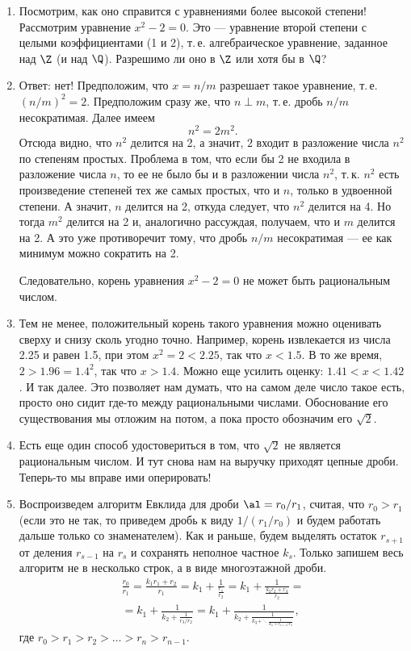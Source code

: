 \begin{enumerate}
\item Посмотрим, как оно справится с уравнениями более высокой степени! Рассмотрим уравнение $x^2-2=0$. Это --- уравнение второй степени с целыми коэффициентами (1 и 2), т.\,е. алгебраическое уравнение, заданное над $\Z$ (и над $\Q$). Разрешимо ли оно в $\Z$ или хотя бы в $\Q$?
\item Ответ: нет! Предположим, что $x=n/m$ разрешает такое уравнение, т.\,е. $(n/m)^2=2$. Предположим сразу же, что $n\perp m$, т.\,е. дробь $n/m$ несократимая. Далее имеем
$$
n^2=2m^2.
$$
Отсюда видно, что $n^2$ делится на 2, а значит, $2$ входит в разложение числа $n^2$ по степеням простых. Проблема в том, что если бы 2 не входила в разложение числа $n$, то ее не было бы и в разложении числа $n^2$, т.\,к. $n^2$ есть произведение степеней тех же самых простых, что и $n$, только в удвоенной степени. А значит, $n$ делится на 2, откуда следует, что $n^2$ делится на 4. Но тогда $m^2$ делится на 2 и, аналогично рассуждая, получаем, что и $m$ делится на 2. А это уже противоречит тому, что дробь $n/m$ несократимая --- ее как минимум можно сократить на 2.

Следовательно, корень уравнения $x^2-2=0$ не может быть рациональным числом.

\item Тем не менее, положительный корень такого уравнения можно оценивать сверху и снизу сколь угодно точно. Например, корень извлекается из числа 2.25 и равен 1.5, при этом $x^2=2<2.25$, так что $x<1.5$. В то же время, $2>1.96=1.4^2$, так что $x>1.4$. Можно еще усилить оценку: $1.41<x<1.42$. И так далее. Это позволяет нам думать, что на самом деле число такое есть, просто оно сидит где-то между рациональными числами. Обоснование его существования мы отложим на потом, а пока просто обозначим его $\sqrt 2$.
\item Есть еще один способ удостовериться в том, что $\sqrt 2$ не является рациональным числом. И тут снова нам на выручку приходят цепные дроби. Теперь-то мы вправе ими оперировать!

\item Воспроизведем алгоритм Евклида для дроби $\al = r_0/r_1$, считая, что $r_0>r_1$ (если это не так, то приведем дробь к виду $1/(r_1/r_0)$ и будем работать дальше только со знаменателем). Как и раньше, будем выделять остаток $r_{s+1}$ от деления $r_{s-1}$ на $r_s$ и сохранять неполное частное $k_s$. Только запишем весь алгоритм не в несколько строк, а в виде многоэтажной дроби. 
\begin{multline*}
\frac{r_0}{r_1} = \frac{k_1r_1+r_2}{r_1} = \boxed{k_1}+\frac{1}{\frac{r_1}{r_2}} =
\boxed{k_1} + \frac{1}{\frac{k_2r_2+r_3}{r_2}} =  \\
= \boxed{k_1} + \frac{1}{\boxed{k_2} + \frac{1}{r_3/r_2}} = 
\boxed{k_1} + \frac{1}{\boxed{k_2} + \frac{1}{\boxed{k_3} + \ddots \frac{1}{\boxed{k_n}+r_{n+1}/r_n}}},
\end{multline*}
где $r_0>r_1>r_2>\dots>r_n>r_{n-1}$.


\end{enumerate}
